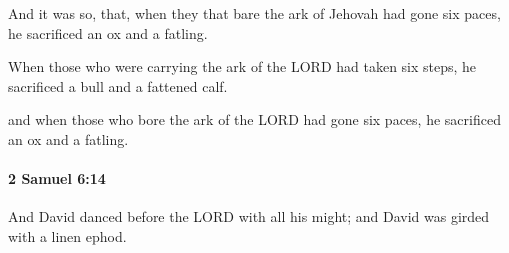 			\begin{versebox}
					\item[BHS] 
					\item[ASV] And it was so, that, when they that bare the ark of Jehovah had gone six paces, he sacrificed an ox and a fatling.
					\item[NIV] When those who were carrying the ark of the LORD had taken six steps, he sacrificed a bull and a fattened calf.
					\item[NRSV] and when those who bore the ark of the LORD had gone six paces, he sacrificed an ox and a fatling.
			\end{versebox}

		\paragraph{2 Samuel 6:14} %
			\label{2SAMUEL-6-14}

			And David danced before the LORD with all his might; and David was girded with a linen ephod.


